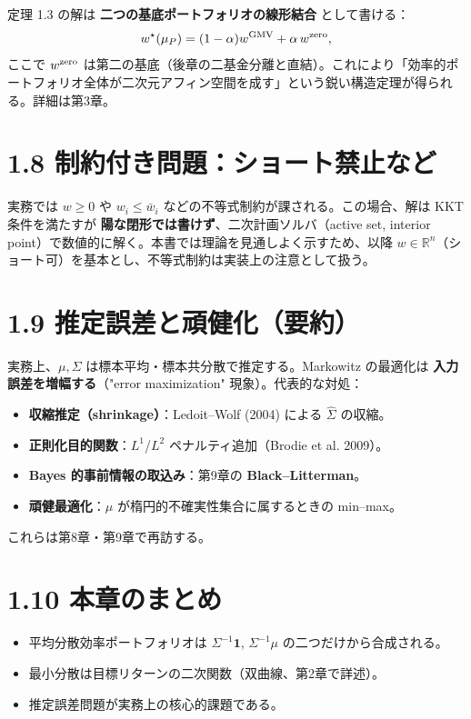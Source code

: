 \documentclass[11pt,a4paper]{report}
\begin{document}
定理 1.3 の解は \textbf{二つの基底ポートフォリオの線形結合} として書ける： \[ w^\star(\mu_P) = (1 - \alpha) w^{\rm GMV} + \alpha\, w^{\rm zero}, \] ここで $w^{\rm zero}$ は第二の基底（後章の二基金分離と直結）。これにより「効率的ポートフォリオ全体が二次元アフィン空間を成す」という鋭い構造定理が得られる。詳細は第3章。

\section{1.8 制約付き問題：ショート禁止など}

実務では $w \ge 0$ や $w_i \le \bar w_i$ などの不等式制約が課される。この場合、解は KKT 条件を満たすが \textbf{陽な閉形では書けず}、二次計画ソルバ（active set, interior point）で数値的に解く。本書では理論を見通しよく示すため、以降 $w \in \mathbb{R}^n$（ショート可）を基本とし、不等式制約は実装上の注意として扱う。

\section{1.9 推定誤差と頑健化（要約）}

実務上、$\mu, \Sigma$ は標本平均・標本共分散で推定する。Markowitz の最適化は \textbf{入力誤差を増幅する}（"error maximization" 現象）。代表的な対処：

\begin{itemize}
\item \textbf{収縮推定（shrinkage）}：Ledoit–Wolf (2004) による $\hat\Sigma$ の収縮。
\item \textbf{正則化目的関数}：$L^1$/$L^2$ ペナルティ追加（Brodie et al. 2009）。
\item \textbf{Bayes 的事前情報の取込み}：第9章の \textbf{Black–Litterman}。
\item \textbf{頑健最適化}：$\mu$ が楕円的不確実性集合に属するときの min–max。
\end{itemize}

これらは第8章・第9章で再訪する。

\section{1.10 本章のまとめ}

\begin{itemize}
\item 平均分散効率ポートフォリオは $\Sigma^{-1}\mathbf{1}$, $\Sigma^{-1}\mu$ の二つだけから合成される。
\item 最小分散は目標リターンの二次関数（双曲線、第2章で詳述）。
\item 推定誤差問題が実務上の核心的課題である。
\end{itemize}
\end{document}
